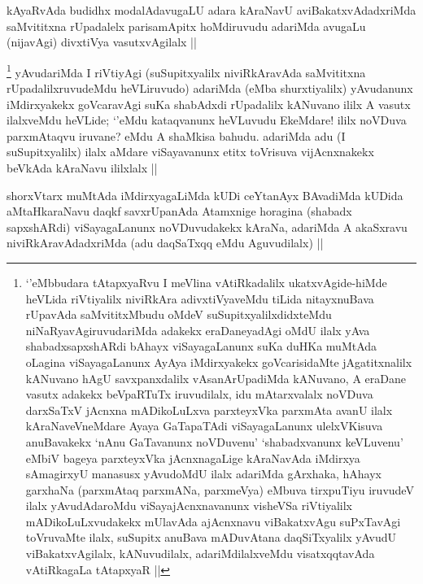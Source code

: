 \begin{artha}
kAyaRvAda budidhx modalAdavugaLU adara kAraNavU aviBakatxvAdadxriMda saMvititxna rUpadalelx parisamApitx hoMdiruvudu adariMda avugaLu (nijavAgi) divxtiVya vasutxvAgilalx ||
\end{artha}


\begin{artha}
\footnote{`\stext'eMbbudara tAtapxyaRvu I meVlina vAtiRkadalilx ukatxvAgide-hiMde heVLida riVtiyalilx niviRkAra adivxtiVyaveMdu tiLida nitayxnuBava rUpavAda saMvititxMbudu oMdeV suSupitxyalilxdidxteMdu niNaRyavAgiruvudariMda adakekx eraDaneyadAgi oMdU ilalx yAva shabadxsapxshARdi bAhayx viSayagaLanunx suKa duHKa muMtAda oLagina viSayagaLanunx AyAya iMdirxyakekx goVcarisidaMte jAgatitxnalilx kANuvano hAgU savxpanxdalilx vAsanArUpadiMda kANuvano, A eraDane vasutx adakekx beVpaRTuTx iruvudilalx, idu mAtarxvalalx noVDuva darxSaTxV jAcnxna mADikoLuLxva parxteyxVka parxmAta avanU ilalx kAraNaveVneMdare Ayaya GaTapaTAdi viSayagaLanunx ulelxVKisuva anuBavakekx `nAnu GaTavanunx noVDuvenu' `shabadxvanunx keVLuvenu' eMbiV bageya parxteyxVka jAcnxnagaLige kAraNavAda iMdirxya sAmagirxyU manasusx yAvudoMdU ilalx adariMda gArxhaka, hAhayx garxhaNa (parxmAtaq parxmANa, parxmeVya) eMbuva tirxpuTiyu iruvudeV ilalx yAvudAdaroMdu viSayajAcnxnavanunx visheVSa riVtiyalilx mADikoLuLxvudakekx mUlavAda ajAcnxnavu viBakatxvAgu suPxTavAgi toVruvaMte ilalx, suSupitx anuBava mADuvAtana daqSiTxyalilx yAvudU viBakatxvAgilalx, kANuvudilalx, adariMdilalxveMdu visatxqqtavAda vAtiRkagaLa tAtapxyaR ||}
yAvudariMda I riVtiyAgi (suSupitxyalilx niviRkAravAda saMvititxna rUpadalilxruvudeMdu heVLiruvudo) adariMda (\stext eMba shurxtiyalilx) yAvudanunx iMdirxyakekx goVcaravAgi suKa shabAdxdi rUpadalilx kANuvano ililx A vasutx ilalxveMdu heVLide; `\stext'eMdu kataqvanunx heVLuvudu EkeMdare! ililx noVDuva parxmAtaqvu iruvane? eMdu A shaMkisa bahudu. adariMda adu (I suSupitxyalilx) ilalx aMdare viSayavanunx etitx toVrisuva vijAcnxnakekx beVkAda kAraNavu ililxlalx ||
\end{artha}



\begin{artha}
shorxVtarx muMtAda iMdirxyagaLiMda kUDi ceYtanAyx BAvadiMda kUDida aMtaHkaraNavu daqkf savxrUpanAda Atamxnige horagina (shabadx sapxshARdi) viSayagaLanunx noVDuvudakekx kAraNa, adariMda A akaSxravu niviRkAravAdadxriMda (adu daqSaTxqq eMdu Aguvudilalx) ||
\end{artha}

